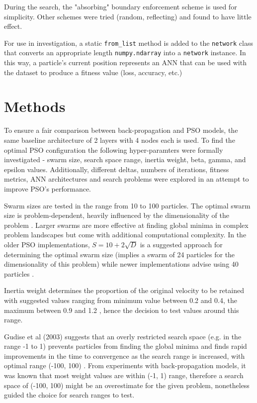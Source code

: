 \documentclass[12pt]{article}
\begin{document}
During the search, the "absorbing" \cite{Chu} boundary enforcement scheme is used
for simplicity. Other schemes were tried (random, reflecting) and found to have
little effect.

For use in investigation, a static \texttt{from\_list} method is added to
the \texttt{network} class that converts an appropriate length \texttt{numpy.ndarray}
into a \texttt{network} instance. In this way, a particle's current position
represents an ANN that can be used with the dataset to produce a fitness value (loss, accuracy, etc.)


\vspace{-1.5em}
\section{Methods}

To ensure a fair comparison between back-propagation and PSO models, the same baseline architecture of 2 layers with 4 nodes each is used. To find the optimal PSO configuration the following hyper-paramters were formally investigated - swarm size, search space range, inertia weight, beta, gamma, and epsilon values. Additionally, different deltas, numbers of iterations, fitness metrics, ANN architectures and search problems were explored in an attempt to improve PSO's performance.

Swarm sizes are tested in the range from 10 to 100 particles. The optimal swarm size is problem-dependent, heavily influenced by the dimensionality of the problem \cite{Razee}. Larger swarms are more effective at finding global minima in complex problem landscapes but come with additional computational complexity. In the older PSO implementations, \(S = 10 + 2\sqrt{D}\) is a suggested approach for determining the optimal swarm size (implies a swarm of 24 particles for the dimensionality of this problem) while newer implementations advise using 40 particles \cite{Clerc}.

Inertia weight determines the proportion of the original velocity to be retained with suggested values ranging from minimum value between 0.2 and 0.4, the maximum between 0.9 and 1.2 \cite{Razee} \cite{Gudise}, hence the decision to test values around this range.

Gudise et al (2003) suggests that an overly restricted search space (e.g. in the range -1 to 1) prevents particles from finding the global minima and finds rapid improvements in the time to convergence as the search range is increased, with optimal range (-100, 100) \cite{Gudise}. From experiments with back-propagation models, it was known that most weight values are within (-1, 1) range, therefore a search space of (-100, 100) might be an overestimate for the given problem, nonetheless guided the choice for search ranges to test.
\end{document}
